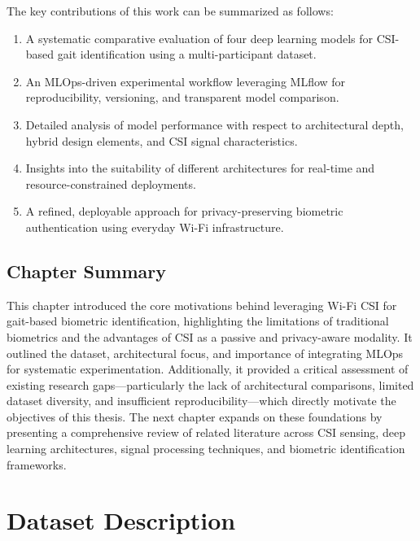 The key contributions of this work can be summarized as follows:

\begin{enumerate}
    \item A systematic comparative evaluation of four deep learning models for CSI-based gait identification using a multi-participant dataset.
    \item An MLOps-driven experimental workflow leveraging MLflow for reproducibility, versioning, and transparent model comparison.
    \item Detailed analysis of model performance with respect to architectural depth, hybrid design elements, and CSI signal characteristics.
    \item Insights into the suitability of different architectures for real-time and resource-constrained deployments.
    \item A refined, deployable approach for privacy-preserving biometric authentication using everyday Wi-Fi infrastructure.
\end{enumerate}

\subsection{Chapter Summary}

This chapter introduced the core motivations behind leveraging Wi-Fi CSI for gait-based biometric identification, highlighting the limitations of traditional biometrics and the advantages of CSI as a passive and privacy-aware modality. It outlined the dataset, architectural focus, and importance of integrating MLOps for systematic experimentation. Additionally, it provided a critical assessment of existing research gaps—particularly the lack of architectural comparisons, limited dataset diversity, and insufficient reproducibility—which directly motivate the objectives of this thesis. The next chapter expands on these foundations by presenting a comprehensive review of related literature across CSI sensing, deep learning architectures, signal processing techniques, and biometric identification frameworks.





\section{Dataset Description}

